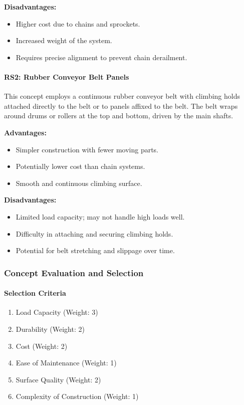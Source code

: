 \textbf{Disadvantages:}
\begin{itemize}
    \item Higher cost due to chains and sprockets.
    \item Increased weight of the system.
    \item Requires precise alignment to prevent chain derailment.
\end{itemize}

\paragraph{RS2: Rubber Conveyor Belt Panels}

This concept employs a continuous rubber conveyor belt with climbing holds attached directly to the belt or to panels affixed to the belt. The belt wraps around drums or rollers at the top and bottom, driven by the main shafts.

\textbf{Advantages:}
\begin{itemize}
    \item Simpler construction with fewer moving parts.
    \item Potentially lower cost than chain systems.
    \item Smooth and continuous climbing surface.
\end{itemize}

\textbf{Disadvantages:}
\begin{itemize}
    \item Limited load capacity; may not handle high loads well.
    \item Difficulty in attaching and securing climbing holds.
    \item Potential for belt stretching and slippage over time.
\end{itemize}

\subsubsection{Concept Evaluation and Selection}

\paragraph{Selection Criteria}

\begin{enumerate}
    \item Load Capacity (Weight: 3)
    \item Durability (Weight: 2)
    \item Cost (Weight: 2)
    \item Ease of Maintenance (Weight: 1)
    \item Surface Quality (Weight: 2)
    \item Complexity of Construction (Weight: 1)
\end{enumerate}

